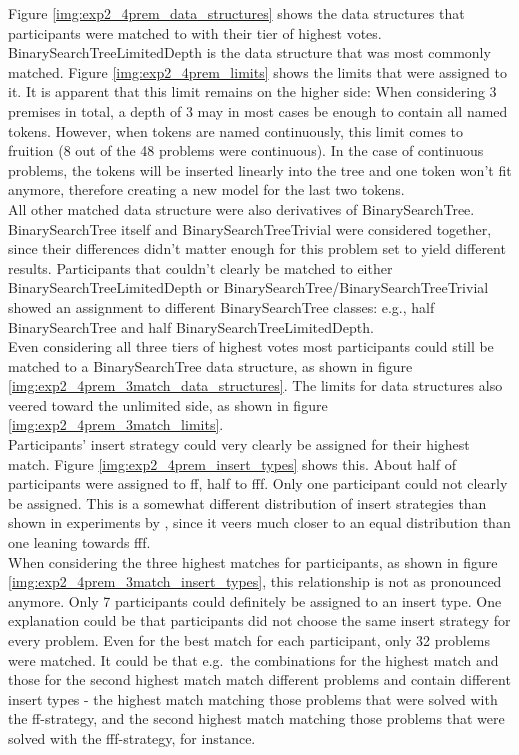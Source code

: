 \documentclass[hidelinks]{scrartcl}
\begin{document}
Figure \ref{img:exp2_4prem_data_structures} shows the data structures that participants were matched to with their tier of highest votes. BinarySearchTreeLimitedDepth is the data structure that was most commonly matched. Figure \ref{img:exp2_4prem_limits} shows the limits that were assigned to it. It is apparent that this limit remains on the higher side: When considering 3 premises in total, a depth of 3 may in most cases be enough to contain all named tokens. However, when tokens are named continuously, this limit comes to fruition (8 out of the 48 problems were continuous). In the case of continuous problems, the tokens will be inserted linearly into the tree and one token won't fit anymore, therefore creating a new model for the last two tokens. \\
All other matched data structure were also derivatives of BinarySearchTree. BinarySearchTree itself and BinarySearchTreeTrivial were considered together, since their differences didn't matter enough for this problem set to yield different results. Participants that couldn't clearly be matched to either BinarySearchTreeLimitedDepth or BinarySearchTree/BinarySearchTreeTrivial showed an assignment to different BinarySearchTree classes: e.g., half BinarySearchTree and half BinarySearchTreeLimitedDepth. \\
Even considering all three tiers of highest votes most participants could still be matched to a BinarySearchTree data structure, as shown in figure \ref{img:exp2_4prem_3match_data_structures}. The limits for data structures also veered toward the unlimited side, as shown in figure \ref{img:exp2_4prem_3match_limits}. \\
Participants' insert strategy could very clearly be assigned for their highest match. Figure \ref{img:exp2_4prem_insert_types} shows this. About half of participants were assigned to ff, half to fff. Only one participant could not clearly be assigned. This is a somewhat different distribution of insert strategies than shown in experiments by \cite{Ragni.2013}, since it veers much closer to an equal distribution than one leaning towards fff. \\
When considering the three highest matches for participants, as shown in figure \ref{img:exp2_4prem_3match_insert_types}, this relationship is not as pronounced anymore. Only 7 participants could definitely be assigned to an insert type. One explanation could be that participants did not choose the same insert strategy for every problem. Even for the best match for each participant, only 32 problems were matched. It could be that e.g.\ the combinations for the highest match and those for the second highest match match different problems and contain different insert types - the highest match matching those problems that were solved with the ff-strategy, and the second highest match matching those problems that were solved with the fff-strategy, for instance. \\
\end{document}
